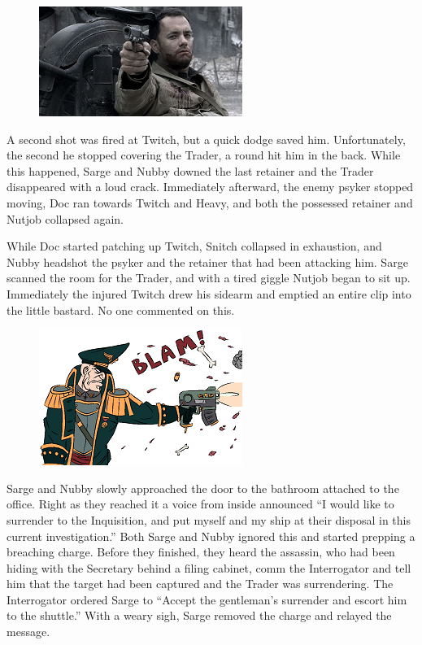 \begin{figure}
\begin{center}
	\includegraphics[width=\figwidth]{pics/3/25.png}
\end{center}
\end{figure}
A second shot was fired at Twitch, but a quick dodge saved him. 
Unfortunately, the second he stopped covering the Trader, a round hit him in the back. 
While this happened, Sarge and Nubby downed the last retainer and the Trader disappeared with a loud crack.
Immediately afterward, the enemy psyker stopped moving, Doc ran towards Twitch and Heavy, and both the possessed retainer and Nutjob collapsed again. 

While Doc started patching up Twitch, Snitch collapsed in exhaustion, and Nubby headshot the psyker and the retainer that had been attacking him. 
Sarge scanned the room for the Trader, and with a tired giggle Nutjob began to sit up.
Immediately the injured Twitch drew his sidearm and emptied an entire clip into the little bastard. 
No one commented on this.

\begin{figure}
\begin{center}
	\includegraphics[width=\figwidth]{pics/3/26.png}
\end{center}
\end{figure}
Sarge and Nubby slowly approached the door to the bathroom attached to the office. 
Right as they reached it a voice from inside announced “I would like to surrender to the Inquisition, and put myself and my ship at their disposal in this current investigation.” 
Both Sarge and Nubby ignored this and started prepping a breaching charge. Before they finished, they heard the assassin, who had been hiding with the Secretary behind a filing cabinet, comm the Interrogator and tell him that the target had been captured and the Trader was surrendering. 
The Interrogator ordered Sarge to “Accept the gentleman’s surrender and escort him to the shuttle.” 
With a weary sigh, Sarge removed the charge and relayed the message. 

